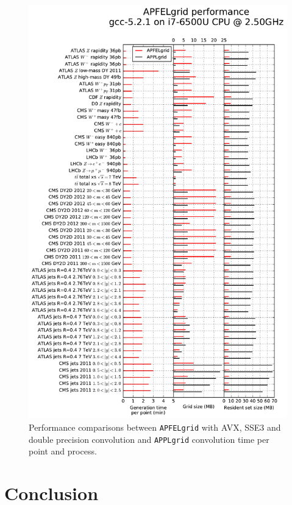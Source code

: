 \documentclass[preprint,12pt]{elsarticle}
\begin{document}
\begin{figure}[p]
  \centering                                      
  \includegraphics[scale=0.6]{plots/t0b}
\caption{\small Performance comparisons between {\tt APFELgrid} with
  AVX, SSE3 and double precision convolution and {\tt APPLgrid}
  convolution time per point and process.}
\label{fig:benchmark}
\end{figure}


\section{Conclusion}
\end{document}
